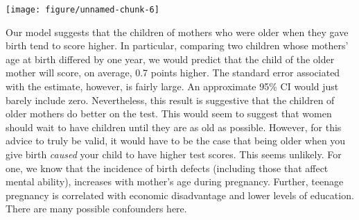 \documentclass[addpoints,12pt]{exam}\usepackage[]{graphicx}\usepackage[]{color}
\makeatletter
\def\maxwidth{ %
  \ifdim\Gin@nat@width>\linewidth
    \linewidth
  \else
    \Gin@nat@width
  \fi
}
\newenvironment{knitrout}{}{} %
\makeatother
\begin{document}
\begin{questions}
\begin{parts}
\begin{solution}
\begin{knitrout}
{\centering \texttt{[image: figure/unnamed-chunk-6]} 

}



\end{knitrout}
Our model suggests that the children of mothers who were older when they gave birth tend to score higher. In particular, comparing two children whose mothers' age at birth differed by one year, we would predict that the child of the older mother will score, on average, 0.7 points higher. The standard error associated with the estimate, however, is fairly large. An approximate 95\% CI would just barely include zero. Nevertheless, this result is suggestive that the children of older mothers do better on the test. This would seem to suggest that women should wait to have children until they are as old as possible. However, for this advice to truly be valid, it would have to be the case that being older when you give birth \emph{caused} your child to have higher test scores. This seems unlikely. For one, we know that the incidence of birth defects (including those that affect mental ability), increases with mother's age during pregnancy. Further, teenage pregnancy is correlated with economic disadvantage and lower levels of education. There are many possible confounders here.
    \end{solution}

\end{parts}
\end{questions}
\end{document}
